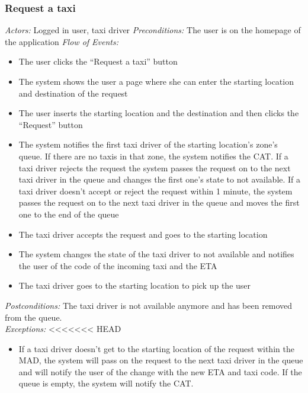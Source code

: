 \documentclass{article}
\begin{document}
\subsubsection{Request a taxi}
\textit{Actors:} Logged in user, taxi driver
\textit{Preconditions:} The user is on the homepage of the application
\textit{Flow of Events:}
\begin{itemize}
	\item  The user clicks the ``Request a taxi'' button
	\item  The system shows the user a page where she can enter the starting location and destination of the request
	\item  The user inserts the starting location and the destination and then clicks the ``Request'' button
	\item  The system notifies the first taxi driver of the starting location's zone's queue. If there are no taxis in that zone, the system notifies the CAT\@. If a taxi driver rejects the request the system passes the request on to the next taxi driver in the queue and changes the first one's state to not available. If a taxi driver doesn't accept or reject the request within 1 minute, the system passes the request on to the next taxi driver in the queue and moves the first one to the end of the queue
	\item  The taxi driver accepts the request and goes to the starting location
	\item  The system changes the state of the taxi driver to not available and notifies the user of the code of the incoming taxi and the ETA 
	\item The taxi driver goes to the starting location to pick up the user
\end{itemize}
\textit{Postconditions:} The taxi driver is not available anymore and has been removed from the queue.
\\\textit{Exceptions:}
<<<<<<< HEAD
	\begin{itemize}
		\item If a taxi driver doesn't get to the starting location of the request within the MAD, the system will pass on the request to the next taxi driver in the queue and will notify the user of the change with the new ETA and taxi code. If the queue is empty, the system will notify the CAT.
	\end{itemize}
	
\end{document}
